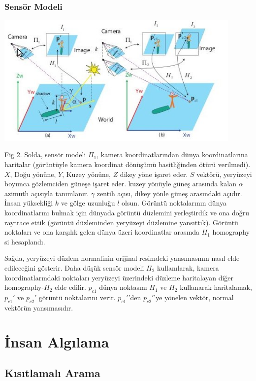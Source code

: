 \documentclass{beamer}
\begin{document}
\begin{frame}[allowframebreaks]
	\frametitle{Sensör Modeli}

	\includegraphics[width=0.9\textwidth]{img/fig2.jpg}\label{fig:sensor-model}

	\begin{scriptsize}
		Fig 2.
		Solda, sensör modeli $\Pi_1$, kamera koordinatlarından dünya koordinatlarına
		haritalar (görüntüyle kamera koordinat dönüşümü basitliğinden ötürü
		verilmedi). $X$, Doğu yönüne, $Y$, Kuzey yönüne, $Z$ dikey yöne işaret eder.
		$S$ vektörü, yeryüzeyi boyunca gözlemciden güneşe işaret eder. kuzey yönüyle
		güneş arasında kalan $\alpha$ azimuth açısıyla tanımlanır. $\gamma$ zentih
		açısı, dikey yönle güneş arasındaki açıdır. İnsan yüksekliği $k$ ve gölge
		uzunluğu $l$ olsun. Görüntü noktalarının dünya koordinatlarını bulmak için
		dünyada görüntü düzlemini yerleştirdik ve ona doğru raytrace ettik (görüntü
		düzleminden yeryüzeyi düzlemine yansıttık). Görüntü noktaları ve ona
		karşılık gelen dünya üzeri koordinatlar arasında $H_1$ homography si
		hesaplandı.

		Sağda, yeryüzeyi düzlem normalinin orijinal resimdeki yansımasının nasıl
		elde edileceğini gösterir. Daha düşük sensör modeli $\Pi_2$ kullanılarak,
		kamera koordinatlarındaki noktaları yeryüzeyi üzerindeki düzleme haritalayan
		diğer homography-$H_2$ elde edilir. $p_{c1}$ dünya noktasını $H_1$ ve $H_2$
		kullanarak haritalamak, $p_{c1}'$ ve $p_{c2}'$ görüntü noktalarını verir.
		$p_{c1}'$'den $p_{c2}'$'ye yönelen vektör, normal vektörün yansımasıdır.
	\end{scriptsize}
\end{frame}

\section{İnsan Algılama}
\subsection{Kısıtlamalı Arama}
\end{document}

